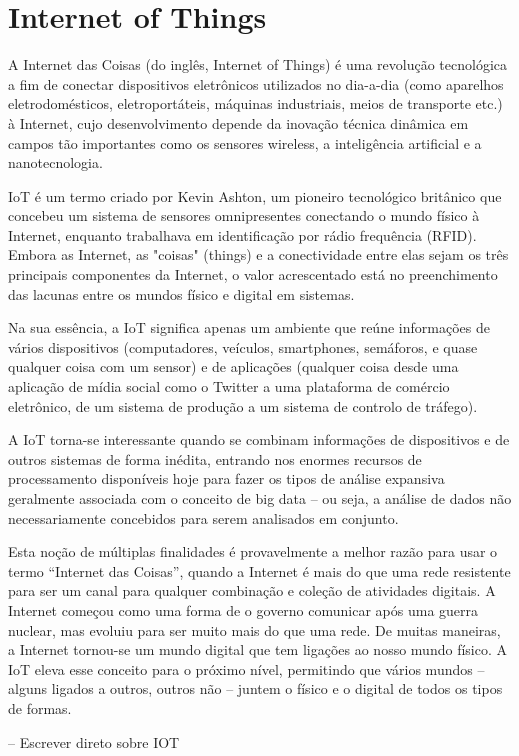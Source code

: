 \section{Internet of Things}
\label{sec:iot}

A Internet das Coisas (do inglês, Internet of Things) é uma revolução tecnológica a fim de conectar dispositivos eletrônicos utilizados no dia-a-dia (como aparelhos eletrodomésticos, eletroportáteis, máquinas industriais, meios de transporte etc.) à Internet, cujo desenvolvimento depende da inovação técnica dinâmica em campos tão importantes como os sensores wireless, a inteligência artificial e a nanotecnologia.

IoT é um termo criado por Kevin Ashton, um pioneiro tecnológico britânico que concebeu um sistema de sensores omnipresentes conectando o mundo físico à Internet, enquanto trabalhava em identificação por rádio frequência (RFID). Embora as Internet, as "coisas" (things) e a conectividade entre elas sejam os três principais componentes da Internet, o valor acrescentado está no preenchimento das lacunas entre os mundos físico e digital em sistemas.

Na sua essência, a IoT significa apenas um ambiente que reúne informações de vários dispositivos (computadores, veículos, smartphones, semáforos, e quase qualquer coisa com um sensor) e de aplicações (qualquer coisa desde uma aplicação de mídia social como o Twitter a uma plataforma de comércio eletrônico, de um sistema de produção a um sistema de controlo de tráfego).

A IoT torna-se interessante quando se combinam informações de dispositivos e de outros sistemas de forma inédita, entrando nos enormes recursos de processamento disponíveis hoje para fazer os tipos de análise expansiva geralmente associada com o conceito de big data – ou seja, a análise de dados não necessariamente concebidos para serem analisados em conjunto.

Esta noção de múltiplas finalidades é provavelmente a melhor razão para usar o termo “Internet das Coisas”, quando a Internet é mais do que uma rede resistente para ser um canal para qualquer combinação e coleção de atividades digitais. A Internet começou como uma forma de o governo comunicar após uma guerra nuclear, mas evoluiu para ser muito mais do que uma rede. De muitas maneiras, a Internet tornou-se um mundo digital que tem ligações ao nosso mundo físico. A IoT eleva esse conceito para o próximo nível, permitindo que vários mundos – alguns ligados a outros, outros não – juntem o físico e o digital de todos os tipos de formas.


-- Escrever direto sobre IOT
